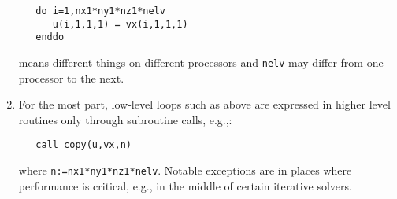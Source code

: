 \begin{enumerate}
\begin{verbatim}
   do i=1,nx1*ny1*nz1*nelv
      u(i,1,1,1) = vx(i,1,1,1)
   enddo
\end{verbatim}

   means different things on different processors and {\tt nelv} may
   differ from one processor to the next.  

\item For the most part, low-level loops such as above are expressed in
   higher level routines only through subroutine calls, e.g.,:

\begin{verbatim}
   call copy(u,vx,n)
\end{verbatim}

   where {\tt n:=nx1*ny1*nz1*nelv}.   Notable exceptions are in places where
   performance is critical, e.g., in the middle of certain iterative
   solvers.

\end{enumerate}

